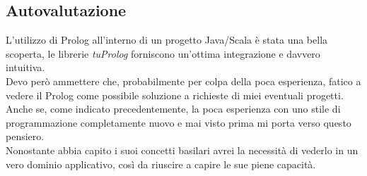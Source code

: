\documentclass[10pt,english]{article}
\begin{document}
\subsection{Autovalutazione}
L'utilizzo di Prolog all'interno di un progetto Java/Scala è stata una bella scoperta, le librerie \textit{tuProlog} forniscono un'ottima integrazione e davvero intuitiva. \\
Devo però ammettere che, probabilmente per colpa della poca esperienza, fatico a vedere il Prolog come possibile soluzione a richieste di miei eventuali progetti. 
\\
Anche se, come indicato precedentemente, la poca esperienza con uno stile di programmazione completamente nuovo e mai visto prima mi porta verso questo pensiero. \\
Nonostante abbia capito i suoi concetti basilari avrei la necessità di vederlo in un vero dominio applicativo, così da riuscire a capire le sue piene capacità. 


 
\end{document}
